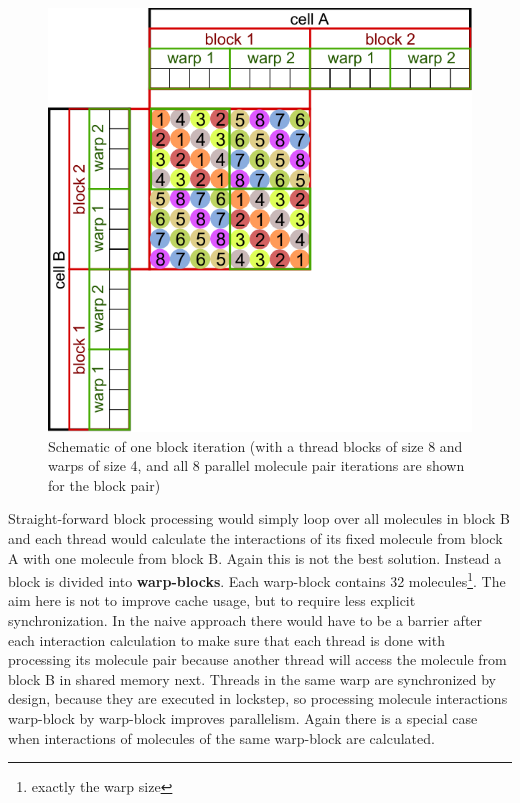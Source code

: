 \begin{figure}
\caption{Schematic of one block iteration (with a thread blocks of size 8 and warps of size 4, and all 8 parallel molecule pair iterations are shown for the block pair)}
\centering
\includegraphics{figures/cellprocessor_block_iteration_1.pdf}
\end{figure}

Straight-forward block processing would simply loop over all molecules in block B and each thread would calculate the interactions of its fixed molecule from block A with one molecule from block B.
Again this is not the best solution. Instead a block is divided into \textbf{warp-blocks}. Each warp-block contains 32 molecules\footnote{exactly the warp size}.
The aim here is not to improve cache usage, but to require less explicit synchronization.
In the naive approach there would have to be a barrier after each interaction calculation to make sure that each thread is done with processing its molecule pair because another thread will access the molecule from block B in shared memory next.
Threads in the same warp are synchronized by design, because they are executed in lockstep, so processing  molecule interactions warp-block by warp-block improves parallelism.
Again there is a special case when interactions of molecules of the same warp-block are calculated.

